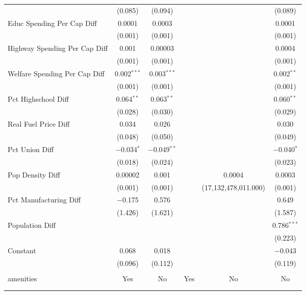 \begin{table}[!htbp]
\begin{tabular}{@{\extracolsep{5pt}}lccccc}
  & (0.085) & (0.094) &  &  & (0.089) \\ 
  Educ Spending Per Cap Diff & 0.0001 & 0.0003 &  &  & 0.0001 \\ 
  & (0.001) & (0.001) &  &  & (0.001) \\ 
  Highway Spending Per Cap Diff & 0.001 & 0.00003 &  &  & 0.0004 \\ 
  & (0.001) & (0.001) &  &  & (0.001) \\ 
  Welfare Spending Per Cap Diff & 0.002$^{***}$ & 0.003$^{***}$ &  &  & 0.002$^{**}$ \\ 
  & (0.001) & (0.001) &  &  & (0.001) \\ 
  Pct Highschool Diff & 0.064$^{**}$ & 0.063$^{**}$ &  &  & 0.060$^{**}$ \\ 
  & (0.028) & (0.030) &  &  & (0.029) \\ 
  Real Fuel Price Diff & 0.034 & 0.026 &  &  & 0.030 \\ 
  & (0.048) & (0.050) &  &  & (0.049) \\ 
  Pct Union Diff & $-$0.034$^{*}$ & $-$0.049$^{**}$ &  &  & $-$0.040$^{*}$ \\ 
  & (0.018) & (0.024) &  &  & (0.023) \\ 
  Pop Density Diff & 0.00002 & 0.001 &  & 0.0004 & 0.0003 \\ 
  & (0.001) & (0.001) &  & (17,132,478,011.000) & (0.001) \\ 
  Pct Manufacturing Diff & $-$0.175 & 0.576 &  &  & 0.649 \\ 
  & (1.426) & (1.621) &  &  & (1.587) \\ 
  Population Diff &  &  &  &  & 0.786$^{***}$ \\ 
  &  &  &  &  & (0.223) \\ 
  Constant & 0.068 & 0.018 &  &  & $-$0.043 \\ 
  & (0.096) & (0.112) &  &  & (0.119) \\ 
 \hline \\[-1.8ex] 
amenities & Yes & No & Yes & No & No \\ 
\hline \\[-1.8ex] 
\hline 
\hline \\[-1.8ex] 
\end{tabular} 
\end{table} 
